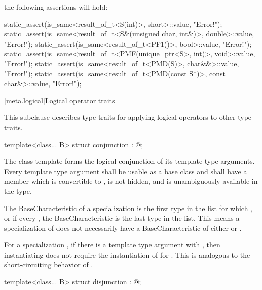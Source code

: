 the following assertions will hold:

\begin{codeblock}
static_assert(is_same<result_of_t<S(int)>, short>::value, "Error!");
static_assert(is_same<result_of_t<S&(unsigned char, int&)>, double>::value, "Error!");
static_assert(is_same<result_of_t<PF1()>, bool>::value, "Error!");
static_assert(is_same<result_of_t<PMF(unique_ptr<S>, int)>, void>::value, "Error!");
static_assert(is_same<result_of_t<PMD(S)>, char&&>::value, "Error!");
static_assert(is_same<result_of_t<PMD(const S*)>, const char&>::value, "Error!");
\end{codeblock}
\exitexample

[meta.logical]{Logical operator traits}

\pnum
This subclause describes type traits for applying logical operators
to other type traits.

%
\begin{itemdecl}
template<class... B> struct conjunction : @\seebelow@ { };
\end{itemdecl}

\begin{itemdescr}
\pnum
The class template 
forms the logical conjunction of its template type arguments.
Every template type argument
shall be usable as a base class and
shall have a member  which
is convertible to ,
is not hidden, and
is unambiguously available in the type.

\pnum
The BaseCharacteristic of a specialization 
is the first type  in the list 
for which , or
if every ,
the BaseCharacteristic is the last type in the list.
\enternote This means a specialization of 
does not necessarily have a BaseCharacteristic
of either  or .
\exitnote

\pnum
For a specialization ,
if there is a template type argument  with ,
then instantiating 
does not require the instantiation of  for .
\enternote This is analogous to the short-circuiting behavior of \tcode{\&\&}.
\exitnote
\end{itemdescr}

%
\begin{itemdecl}
template<class... B> struct disjunction : @\seebelow@ { };
\end{itemdecl}

